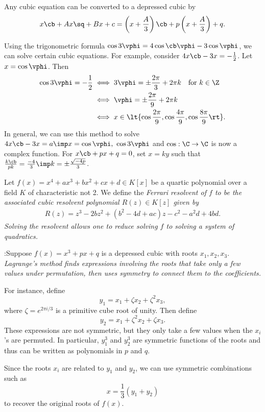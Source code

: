 \documentclass[a4paper]{article}
\begin{document}
 \quad
Any cubic equation can be converted to a depressed cubic by \begin{align*}
  x\cb+Ax\sq+Bx+c = \left(x+\frac{A}{3}\right)\cb + p\left(x+\frac{A}{3}\right) + q.
\end{align*}

\quad
Using the trigonometric formula \( \cos 3\vphi = 4\cos\cb \vphi-3\cos\vphi \), we can solve certain cubic equations.
For example, consider \( 4x\cb-3x=-\frac{1}{2} \).
Let \( x=\cos \vphi \).
Then \begin{align*}
  \cos 3\vphi = -\frac{1}{2} &\iff 3\vphi = \pm \frac{2\pi}{3}+2\pi k \quad \text{for } k\in \Z \\
  &\iff \vphi = \pm\frac{2\pi}{9}+2\pi k \\
  &\iff x \in \lt\{ \cos\frac{2\pi}{9},\cos\frac{4\pi}{9},\cos\frac{8\pi}{9} \rt\}.
\end{align*}
In general, we can use this method to solve \( 4x\cb-3x=a \imp x=\cos\vphi,\ \cos 3\vphi \) and \( \cos:\C\to\C \) is now a complex function.
For \( x\cb+px+q = 0 \), set \( x=ky \) such that \( \frac{k\cb}{pk} = \frac{-4}{3} \imp k = \pm\frac{\sqrt{-4p}}{3} \).

\begin{tdefinition}
  Let \( f(x) = x^4 + a x^3 + b x^2 + c x + d \in K[x] \) be a quartic polynomial over a field \( K \) of characteristic not 2.
  We define the \it{Ferrari resolvent} of \( f \) to be the associated cubic resolvent polynomial \( R(z) \in K[z] \) given by
  \begin{align*}
    R(z) = z^3 - 2b z^2 + (b^2 - 4d + a c) z - c^2 - a^2 d + 4b d.
  \end{align*}
  Solving the resolvent allows one to reduce solving \( f \) to solving a system of quadratics.
\end{tdefinition}

:\quad Suppose \( f(x) = x^3 + px + q \) is a depressed cubic with roots \( x_1, x_2, x_3 \).
    \it{Lagrange's method} finds expressions involving the roots that take only a few values under permutation, then uses symmetry to connect them to the coefficients.

    For instance, define
    \[
      y_1 = x_1 + \zeta x_2 + \zeta^2 x_3,
    \]
    where \( \zeta = e^{2\pi i/3} \) is a primitive cube root of unity. Then define
    \[
      y_2 = x_1 + \zeta^2 x_2 + \zeta x_3.
    \]
    These expressions are not symmetric, but they only take a few values when the \( x_i \)'s are permuted. In particular, \( y_1^3 \) and \( y_2^3 \) are symmetric functions of the roots and thus can be written as polynomials in \( p \) and \( q \).

    Since the roots \( x_i \) are related to \( y_1 \) and \( y_2 \), we can use symmetric combinations such as
    \[
      x = \frac{1}{3}(y_1 + y_2)
    \]
    to recover the original roots of \( f(x) \).
\end{document}
